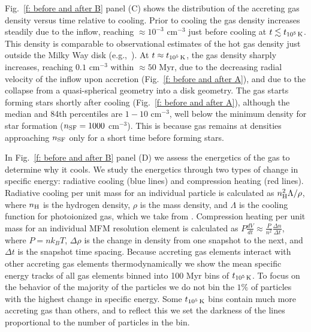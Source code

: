 \documentclass[fleqn,usenatbib]{mnras}
\newcommand{\tcools}{t_{10^5\,{\rm K}}}
\newcommand{\nH}{n_{\rm H}}
\begin{document}
Fig.~\ref{f: before and after B} panel (C) shows the distribution of the accreting gas density versus time relative to cooling.
Prior to cooling the gas density increases steadily due to the inflow, reaching $\approx10^{-3}$ cm$^{-3}$ just before cooling at $t\lesssim\tcools$.
This density is comparable to observational estimates of the hot gas density just outside the Milky Way disk (e.g.,~\citealt{Li2017a}).
At $t\approx\tcools$, the gas density sharply increases, reaching $0.1$ cm$^{-3}$ within $\approx50$ Myr, due to the decreasing radial velocity of the inflow upon accretion (Fig.~\ref{f: before and after A}), and due to the collapse from a quasi-spherical geometry into a disk geometry.
The gas starts forming stars shortly after cooling (Fig.~\ref{f: before and after A}), although the median and 84th percentiles are $1-10$ cm$^{-3}$, well below the minimum density for star formation ($n_{\rm SF} = 1000$ cm$^{-3}$).
This is because gas remains at densities approaching $n_{\rm SF}$ only for a short time before forming stars.

In Fig.~\ref{f: before and after B} panel (D) we assess the energetics of the gas to determine why it cools.
We study the energetics through two types of change in specific energy: radiative cooling (blue lines) and compression heating (red lines).
Radiative cooling per unit mass for an individual particle is calculated as $\nH^2 \Lambda / \rho$, where $\nH$ is the hydrogen density, $\rho$ is the mass density, and $\Lambda$ is the cooling function for photoionized gas, which we take from \cite{Wiersma2009a}.
Compression heating per unit mass for an individual MFM resolution element is calculated as $P \frac{dV}{dt} \approx \frac{ P }{ n^2 } \frac{ \Delta n }{ \Delta t }$, where $P = n k_B T$, $\Delta \rho$ is the change in density from one snapshot to the next, and $\Delta t$ is the snapshot time spacing.
Because accreting gas elements interact with other accreting gas elements thermodynamically we show the mean specific energy tracks of all gas elements binned into 100 Myr bins of $\tcools$.
To focus on the behavior of the majority of the particles we do not bin the $1\%$ of particles with the highest change in specific energy.
Some $\tcools$ bins contain much more accreting gas than others, and to reflect this we set the darkness of the lines proportional to the number of particles in the bin.
\end{document}
